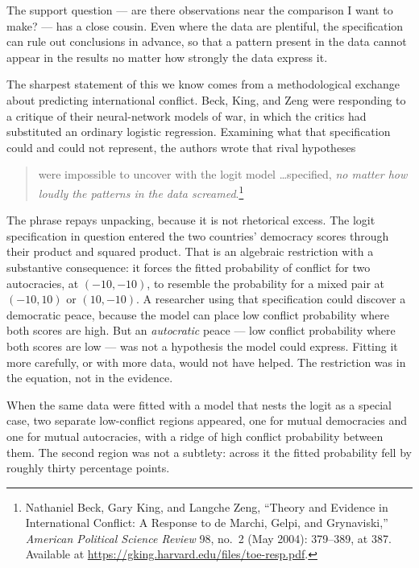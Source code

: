 \documentclass[11pt]{report}
\begin{document}
The support question --- are there observations near the comparison I want to make? --- has a close cousin. Even where the data are plentiful, the specification can rule out conclusions in advance, so that a pattern present in the data cannot appear in the results no matter how strongly the data express it.

The sharpest statement of this we know comes from a methodological exchange about predicting international conflict. Beck, King, and Zeng were responding to a critique of their neural-network models of war, in which the critics had substituted an ordinary logistic regression. Examining what that specification could and could not represent, the authors wrote that rival hypotheses

\begin{quote}
were impossible to uncover with the logit model \ldots specified, \emph{no matter how loudly the patterns in the data screamed}.\footnote{Nathaniel Beck, Gary King, and Langche Zeng, ``Theory and Evidence in International Conflict: A Response to de Marchi, Gelpi, and Grynaviski,'' \emph{American Political Science Review} 98, no.~2 (May 2004): 379--389, at 387. Available at \url{https://gking.harvard.edu/files/toe-resp.pdf}.}
\end{quote}

The phrase repays unpacking, because it is not rhetorical excess. The logit specification in question entered the two countries' democracy scores through their product and squared product. That is an algebraic restriction with a substantive consequence: it forces the fitted probability of conflict for two autocracies, at \((-10,-10)\), to resemble the probability for a mixed pair at \((-10,10)\) or \((10,-10)\). A researcher using that specification could discover a democratic peace, because the model can place low conflict probability where both scores are high. But an \emph{autocratic} peace --- low conflict probability where both scores are low --- was not a hypothesis the model could express. Fitting it more carefully, or with more data, would not have helped. The restriction was in the equation, not in the evidence.

When the same data were fitted with a model that nests the logit as a special case, two separate low-conflict regions appeared, one for mutual democracies and one for mutual autocracies, with a ridge of high conflict probability between them. The second region was not a subtlety: across it the fitted probability fell by roughly thirty percentage points.
\end{document}
